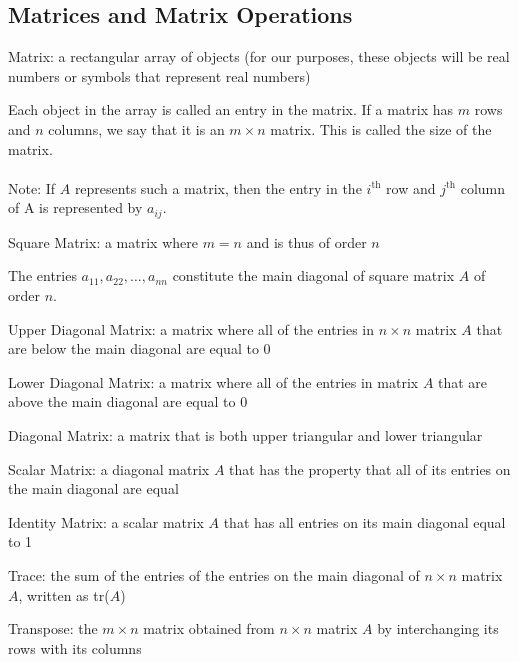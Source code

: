 \documentclass[12pt]{article}
\begin{document}
 \subsection{Matrices and Matrix Operations}
\begin{definition} Matrix: a rectangular array of objects (for our purposes, these objects will be real numbers or symbols that represent real numbers) \end{definition} Each object in the array is called an entry in the matrix. \newline
 If a matrix has $m$ rows and $n$ columns, we say that it is an $m \times n$ matrix. This is called the size of the matrix. \\~\\
 Note: If $A$ represents such a matrix, then the entry in the $i^\text{th}$ row and $j^\text{th}$ column of A is represented by $a_{ij}$. \newline
\begin{definition} Square Matrix: a matrix where $m = n$ and is thus of order $n$ \end{definition} 
The entries $a_{11}, a_{22}, \dots , a_{nn} $ constitute the main diagonal of square matrix $A$ of order $n$. 
\begin{definition} Upper Diagonal Matrix: a matrix where all of the entries in $n \times n$ matrix $A$ that are below the main diagonal are equal to 0 \end{definition} 
\begin{definition} Lower Diagonal Matrix: a matrix where all of the entries in matrix $A$ that are above the main diagonal are equal to 0 \end{definition} 
\begin{definition} Diagonal Matrix: a matrix that is both upper triangular and lower triangular \end{definition} 
\begin{definition} Scalar Matrix: a diagonal matrix $A$ that has the property that all of its entries on the main diagonal are equal \end{definition}
\begin{definition} Identity Matrix: a scalar matrix $A$ that has all entries on its main diagonal equal to 1 \end{definition}
\begin{definition} Trace: the sum of the entries of the entries on the main diagonal of $n \times n$ matrix $A$, written as tr($A$) \end{definition}
\begin{definition} Transpose: the $m \times n$ matrix obtained from $n \times n$ matrix $A$ by interchanging its rows with its columns \end{definition} 
\end{document}
